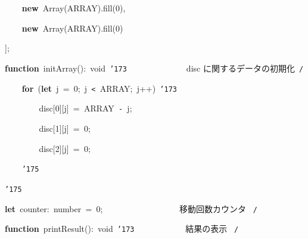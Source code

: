 \documentclass[a4paper,10pt]{article}
\def\mc{\relax}
\begin{document}
\noindent
\mbox{}{\tt\mc \ }{\tt\mc \ }{\tt\mc \ }{\tt\mc \ }\textbf{new}{\tt\mc \ }Array(ARRAY).fill(0),

\noindent
\mbox{}{\tt\mc \ }{\tt\mc \ }{\tt\mc \ }{\tt\mc \ }\textbf{new}{\tt\mc \ }Array(ARRAY).fill(0)

\noindent
\mbox{}];

\noindent
\mbox{}\hfill

\noindent
\mbox{}\textbf{function}{\tt\mc \ }initArray():{\tt\mc \ }void{\tt\mc \ }{\tt\char'173}{\tt\mc \ }{\tt\mc \ }{\tt\mc \ }{\tt\mc \ }{\tt\mc \ }{\tt\mc \ }{\tt\mc \ }{\tt\mc \ }{\tt\mc \ }{\tt\mc \ }{\tt\mc \ }{\tt\mc \ }\rm\mc {\tt /}{\tt *}\  \ disc に関するデータの初期化\hfill \rm\mc \ {\tt *}{\tt /}
\tt\mc 

\noindent
\mbox{}{\tt\mc \ }{\tt\mc \ }{\tt\mc \ }{\tt\mc \ }\textbf{for}{\tt\mc \ }(\textbf{let}{\tt\mc \ }j{\tt\mc \ }={\tt\mc \ }0;{\tt\mc \ }j{\tt\mc \ }{\tt <}{\tt\mc \ }ARRAY;{\tt\mc \ }j++){\tt\mc \ }{\tt\char'173}

\noindent
\mbox{}{\tt\mc \ }{\tt\mc \ }{\tt\mc \ }{\tt\mc \ }{\tt\mc \ }{\tt\mc \ }{\tt\mc \ }{\tt\mc \ }disc[0][j]{\tt\mc \ }={\tt\mc \ }ARRAY{\tt\mc \ }{\tt -}{\tt\mc \ }j;

\noindent
\mbox{}{\tt\mc \ }{\tt\mc \ }{\tt\mc \ }{\tt\mc \ }{\tt\mc \ }{\tt\mc \ }{\tt\mc \ }{\tt\mc \ }disc[1][j]{\tt\mc \ }={\tt\mc \ }0;

\noindent
\mbox{}{\tt\mc \ }{\tt\mc \ }{\tt\mc \ }{\tt\mc \ }{\tt\mc \ }{\tt\mc \ }{\tt\mc \ }{\tt\mc \ }disc[2][j]{\tt\mc \ }={\tt\mc \ }0;

\noindent
\mbox{}{\tt\mc \ }{\tt\mc \ }{\tt\mc \ }{\tt\mc \ }{\tt\char'175}

\noindent
\mbox{}{\tt\char'175}

\noindent
\mbox{}\hfill

\noindent
\mbox{}\textbf{let}{\tt\mc \ }counter:{\tt\mc \ }number{\tt\mc \ }={\tt\mc \ }0;{\tt\mc \ }{\tt\mc \ }{\tt\mc \ }{\tt\mc \ }{\tt\mc \ }{\tt\mc \ }{\tt\mc \ }{\tt\mc \ }{\tt\mc \ }{\tt\mc \ }{\tt\mc \ }{\tt\mc \ }{\tt\mc \ }{\tt\mc \ }{\tt\mc \ }{\tt\mc \ }\rm\mc {\tt /}{\tt *}\  \ 移動回数カウンタ \hfill \rm\mc \ {\tt *}{\tt /}
\tt\mc 

\noindent
\mbox{}\hfill

\noindent
\mbox{}\textbf{function}{\tt\mc \ }printResult():{\tt\mc \ }void{\tt\mc \ }{\tt\char'173}{\tt\mc \ }{\tt\mc \ }{\tt\mc \ }{\tt\mc \ }{\tt\mc \ }{\tt\mc \ }{\tt\mc \ }{\tt\mc \ }{\tt\mc \ }{\tt\mc \ }\rm\mc {\tt /}{\tt *}\  \ 結果の表示 \hfill \rm\mc \ {\tt *}{\tt /}
\tt\mc 
\end{document}
